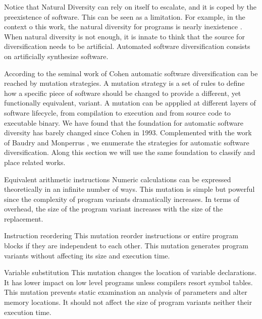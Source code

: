 Notice that Natural Diversity can rely on itself to escalate, and it is coped by the preexistence of software. This can be seen as a limitation. For example, in the context o this work, the natural diversity for \wasm programs is nearly inexistence \cite{Hilbig2021AnES}. When natural diversity is not enough, it is innate to think that the source for diversification needs to be artificial. Automated software diversification consists on artificially synthesize software.

According to the seminal work of Cohen \etal \cite{cohen1993operating} automatic software diversification can be reached by mutation strategies. A mutation strategy is a set of rules to define how a specific piece of software should be changed to provide a different, yet functionally equivalent, variant. A mutation can be appplied at different layers of software lifecycle, from compilation to execution and from source code to executable binary. We have found that the foundation for automatic software diversity has barely changed since Cohen in 1993. Complemented with the work of Baudry and Monperrus \cite{natural_diversity}, we enumerate the strategies for automatic software diversification. Along this section we will use the same foundation to classify and place related works.

\begin{strategy}{Equivalent arithmetic instructions}
    \label{strategy:S1}
    \normalfont
    Numeric calculations can be expressed theoretically in an infinite number of ways. This mutation is simple but powerful since the complexity of program variants dramatically increases. In terms of overhead, the size of the program variant increases with the size of the replacement. 
    
\end{strategy}


\begin{strategy}{Instruction reordering}
    \label{strategy:S2}
    \normalfont
    This mutation reorder instructions or entire program blocks if they are independent to each other. This mutation generates program variants without affecting its size and execution time. 

\end{strategy}

\begin{strategy}{Variable substitution}
    \label{strategy:S3}
    \normalfont
    This mutation changes the location of variable declarations. It has lower impact on low level programs unless compilers resort symbol tables. This mutation prevents static examination an analysis of parameters and alter memory locations. It should not affect the size of program variants neither their execution time.
\end{strategy}


